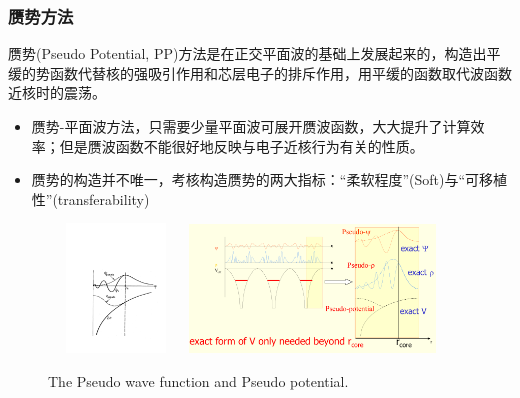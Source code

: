 \documentclass[cjk,slidestop,compress,mathserif,blue]{beamer}
\begin{document}
\frame
{
\frametitle{赝势方法}
赝势(\textrm{Pseudo Potential, PP})方法是在正交平面波的基础上发展起来的，构造出平缓的势函数代替核的强吸引作用和芯层电子的排斥作用，用平缓的函数取代波函数近核时的震荡。
\begin{itemize}
\setlength{\itemsep}{5pt}
	\item 赝势-平面波方法，只需要少量平面波可展开赝波函数，大大提升了计算效率；但是赝波函数不能很好地反映与电子近核行为有关的性质。
	\item 赝势的构造并不唯一，考核构造赝势的两大指标：“柔软程度”\textrm{(Soft)}与“可移植性”\textrm{(transferability)}
\end{itemize}
\begin{figure}[h!]
\centering
\vspace*{-0.10in}
\includegraphics[height=1.35in,width=1.42in,viewport=154 100 562 508,clip]{Figures/Pseudo.pdf}
\includegraphics[height=1.35in,width=2.57in,viewport=1 1 980 500,clip]{Figures/Pseudo-2.png}
\caption{\small \textrm{The Pseudo wave function and Pseudo potential.}}%
\label{Pseudo_Potential-Wave}
\end{figure}
}
\end{document}
